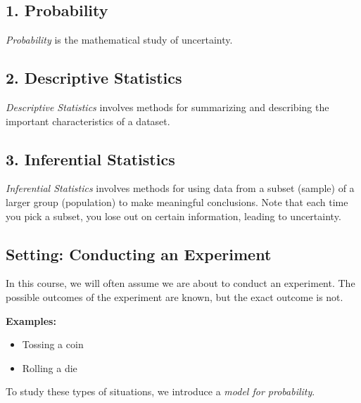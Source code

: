 \documentclass{article}
\begin{document}
\pagebreak

\subsection*{1. Probability}
\textit{Probability} is the mathematical study of uncertainty.

\subsection*{2. Descriptive Statistics}
\textit{Descriptive Statistics} involves methods for summarizing and describing the important characteristics of a dataset.

\subsection*{3. Inferential Statistics}
\textit{Inferential Statistics} involves methods for using data from a subset (sample) of a larger group (population) to make meaningful conclusions. Note that each time you pick a subset, you lose out on certain information, leading to uncertainty.

\subsection*{Setting: Conducting an Experiment}

In this course, we will often assume we are about to conduct an experiment. The possible outcomes of the experiment are known, but the exact outcome is not.

\textbf{Examples:}
\begin{itemize}
    \item Tossing a coin
    \item Rolling a die
\end{itemize}

To study these types of situations, we introduce a \textit{model for probability}.
\end{document}
